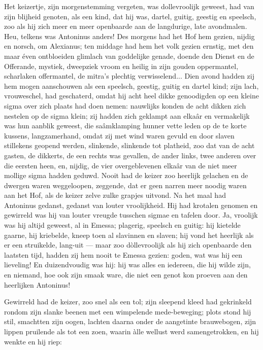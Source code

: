 \documentclass[a4paper, 12pt, oneside, dutch]{article}
\begin{document}
Het keizertje, zijn morgenstemming vergeten, was dollevroolijk geweest, had van zijn blijheid genoten, als een kind, dat hij was, dartel, guitig, geestig en speelsch, zoo als hij zich meer en meer openbaarde aan de langdurige, late avondmalen. Heu, telkens was Antoninus anders! Des morgens had het Hof hem gezien, nijdig en norsch, om Alexianus; ten middage had hem het volk gezien ernstig, met den maar éven ontbloeiden glimlach van goddelijke genade, doende den Dienst en de Offerande, mystiek, dweepziek vroom en heilig in zijn gouden oppermantel, scharlaken offermantel, de mitra's plechtig verwisselend... Dien avond hadden zij hem mogen aanschouwen als een speelsch, geestig, guitig en dartel kind; zijn lach, vrouweschel, had geschaterd, omdat hij acht heel dikke genoodigden op een kleine sigma over zich plaats had doen nemen: nauwlijks konden de acht dikken zich nestelen op de sigma klein; zij hadden zich geklampt aan elkaâr en vermakelijk was hun aanblik geweest, die saâmklamping hunner vette leden op de te korte kussens, langzamerhand, omdat zij met wind waren gevuld en door slaven stillekens geopend werden, slinkende, slinkende tot platheid, zoo dat van de acht gasten, de dikkerts, de een rechts was gevallen, de ander links, twee anderen over die eersten heen, en, nijdig, de vier overgeblevenen elkaâr van de niet meer mollige sigma hadden geduwd. Nooit had de keizer zoo heerlijk gelachen en de dwergen waren weggeloopen, zeggende, dat er geen narren meer noodig waren aan het Hof, als de keizer zelve zulke grapjes uitvond. Na het maal had Antoninus gedanst, gedanst van louter vroolijkheid. Hij had krotalen genomen en gewirreld was hij van louter vreugde tusschen sigmae en tafelen door. Ja, vroolijk was hij altijd geweest, al in Emessa; plagerig, speelsch en guitig: hij kietelde gaarne, hij kriebelde, kneep toen al slavinnen en slaven; hij vond het heerlijk als er een struikelde, lang-uit --- maar zoo dòllevroolijk als hij zich openbaarde den laatsten tijd, hadden zij hem nooit te Emessa gezien: goden, wat was hij een lieveling! En duizendvoudig was hij: hij was alles en iedereen, die hij wilde zijn, en niemand, hoe ook zijn smaak ware, die niet een genot kon proeven aan den heerlijken Antoninus!

Gewirreld had de keizer, zoo snel als een tol; zijn sleepend kleed had gekrinkeld rondom zijn slanke beenen met een wimpelende mede-beweging; plots stond hij stil, smachtten zijn oogen, lachten daarna onder de aangetinte brauwebogen, zijn lippen pruilende als tot een zoen, waarin àlle wellust werd samengetrokken, en hij wenkte en hij riep:
\end{document}
